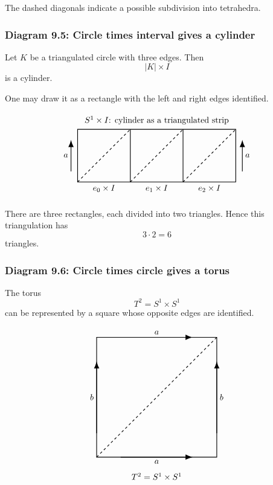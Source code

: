 \documentclass[12pt,a4paper]{article}
\theoremstyle{notespace}
\begin{document}
The dashed diagonals indicate a possible subdivision into tetrahedra.

\subsubsection{Diagram 9.5: Circle times interval gives a cylinder}

Let \(K\) be a triangulated circle with three edges. Then
\[
|K|\times I
\]
is a cylinder.

One may draw it as a rectangle with the left and right edges identified.

\[
\begin{tikzpicture}[scale=1.1]
	\draw[thick] (0,0) rectangle (6,2);
	
	\draw[thick] (2,0)--(2,2);
	\draw[thick] (4,0)--(4,2);
	
	\draw[dashed,thick] (0,0)--(2,2);
	\draw[dashed,thick] (2,0)--(4,2);
	\draw[dashed,thick] (4,0)--(6,2);
	
	\draw[-{Latex[length=3mm]},thick] (-0.25,0.4)--(-0.25,1.6);
	\draw[-{Latex[length=3mm]},thick] (6.25,0.4)--(6.25,1.6);
	
	\node[left] at (-0.25,1) {$a$};
	\node[right] at (6.25,1) {$a$};
	
	\node[below] at (1,0) {$e_0\times I$};
	\node[below] at (3,0) {$e_1\times I$};
	\node[below] at (5,0) {$e_2\times I$};
	
	\node at (3,2.35) {$S^1\times I$: cylinder as a triangulated strip};
\end{tikzpicture}
\]

There are three rectangles, each divided into two triangles. Hence this triangulation has
\[
3\cdot 2=6
\]
triangles.

\subsubsection{Diagram 9.6: Circle times circle gives a torus}

The torus
\[
T^2=S^1\times S^1
\]
can be represented by a square whose opposite edges are identified.

\[
\begin{tikzpicture}[scale=1.25]
	\draw[thick] (0,0) rectangle (4,4);
	
	\draw[dashed,thick] (0,0)--(4,4);
	
	\draw[-{Latex[length=3mm]},thick] (0.8,0)--(3.2,0);
	\draw[-{Latex[length=3mm]},thick] (0.8,4)--(3.2,4);
	
	\draw[-{Latex[length=3mm]},thick] (0,0.8)--(0,3.2);
	\draw[-{Latex[length=3mm]},thick] (4,0.8)--(4,3.2);
	
	\node[below] at (2,0) {$a$};
	\node[above] at (2,4) {$a$};
	
	\node[left] at (0,2) {$b$};
	\node[right] at (4,2) {$b$};
	
	\node at (2,-0.65) {$T^2=S^1\times S^1$};
\end{tikzpicture}
\]
\end{document}
